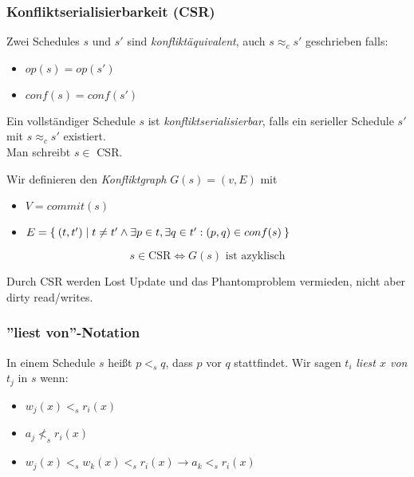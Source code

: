 \documentclass[a4paper,parskip=half*,DIV=15,fontsize=11pt]{scrartcl}
\begin{document}
\subsubsection*{Konfliktserialisierbarkeit (CSR)}
\begin{minipage}[t]{0.45\textwidth}
Zwei Schedules $s$ und $s'$ sind \emph{konfliktäquivalent}, auch $s \approx_c s'$ geschrieben falls:
\begin{itemize}
\item $op(s) = op(s')$
\item $conf(s) = conf(s')$
\end{itemize}
\end{minipage}
\begin{minipage}[t]{0.1\textwidth}
\begin{center}

\end{center}
\end{minipage}
\begin{minipage}[t]{0.45\textwidth}
Ein vollständiger Schedule $s$ ist \emph{konfliktserialisierbar}, falls ein serieller Schedule $s'$ mit $s \approx_c s'$ existiert. \\
Man schreibt $s \in $ CSR.
\end{minipage}

Wir definieren den \emph{Konfliktgraph} $G(s)=(v,E)$ mit
\begin{itemize}
\item $V = commit(s)$
\item $E = \Set{(t,t')|t \neq t' \land \exists p \in t, \exists q \in t':(p,q) \in conf(s)}$
\end{itemize}
$$s \in \textrm{CSR} \Leftrightarrow G(s) \textrm{ ist azyklisch}$$

Durch CSR werden Lost Update und das Phantomproblem vermieden, nicht aber dirty read/writes.

\subsubsection*{''liest von''-Notation}

In einem Schedule $s$ heißt $p <_s q$, dass $p$ vor $q$ stattfindet. Wir sagen $t_i$ \emph{liest $x$ von} $t_j$ in $s$ wenn:
\begin{itemize}
\item $w_j(x) <_s r_i(x)$
\item $a_j \not <_s r_i(x)$
\item $w_j(x) <_s w_k(x) <_s r_i(x) \to a_k <_s r_i(x)$
\end{itemize}
\end{document}
